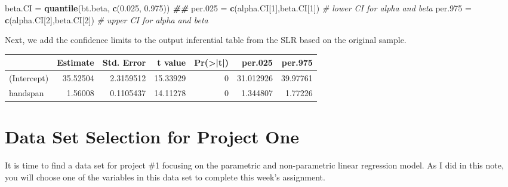 \documentclass[
]{book}
\newenvironment{Shaded}{\begin{snugshade}}{\end{snugshade}}
\newcommand{\CommentTok}[1]{\textcolor[rgb]{0.56,0.35,0.01}{\textit{#1}}}
\newcommand{\DecValTok}[1]{\textcolor[rgb]{0.00,0.00,0.81}{#1}}
\newcommand{\DocumentationTok}[1]{\textcolor[rgb]{0.56,0.35,0.01}{\textbf{\textit{#1}}}}
\newcommand{\FloatTok}[1]{\textcolor[rgb]{0.00,0.00,0.81}{#1}}
\newcommand{\FunctionTok}[1]{\textcolor[rgb]{0.13,0.29,0.53}{\textbf{#1}}}
\newcommand{\NormalTok}[1]{#1}
\newcommand{\OtherTok}[1]{\textcolor[rgb]{0.56,0.35,0.01}{#1}}
\newcommand{\SpecialCharTok}[1]{\textcolor[rgb]{0.81,0.36,0.00}{\textbf{#1}}}
\begin{document}
\begin{Shaded}
\begin{Highlighting}[]
\NormalTok{beta.CI }\OtherTok{=} \FunctionTok{quantile}\NormalTok{(bt.beta, }\FunctionTok{c}\NormalTok{(}\FloatTok{0.025}\NormalTok{, }\FloatTok{0.975}\NormalTok{))}
\DocumentationTok{\#\#}
\NormalTok{per}\FloatTok{.025} \OtherTok{=} \FunctionTok{c}\NormalTok{(alpha.CI[}\DecValTok{1}\NormalTok{],beta.CI[}\DecValTok{1}\NormalTok{])     }\CommentTok{\# lower CI for alpha and beta}
\NormalTok{per}\FloatTok{.975} \OtherTok{=} \FunctionTok{c}\NormalTok{(alpha.CI[}\DecValTok{2}\NormalTok{],beta.CI[}\DecValTok{2}\NormalTok{])     }\CommentTok{\# upper CI for alpha and beta  }
\end{Highlighting}
\end{Shaded}

Next, we add the confidence limits to the output inferential table from the SLR based on the original sample.

\begin{Shaded}
\end{Shaded}

\begin{tabular}{l|r|r|r|r|r|r}
\hline
  & Estimate & Std. Error & t value & Pr(>|t|) & per.025 & per.975\\
\hline
(Intercept) & 35.52504 & 2.3159512 & 15.33929 & 0 & 31.012926 & 39.97761\\
\hline
handspan & 1.56008 & 0.1105437 & 14.11278 & 0 & 1.344807 & 1.77226\\
\hline
\end{tabular}

\hypertarget{data-set-selection-for-project-one}{%
\section{Data Set Selection for Project One}\label{data-set-selection-for-project-one}}

It is time to find a data set for project \#1 focusing on the parametric and non-parametric linear regression model. As I did in this note, you will choose one of the variables in this data set to complete this week's assignment.
\end{document}
